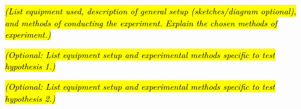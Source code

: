 \documentclass{Laboratory-Report}
\begin{document}
\MakeCover
\MakeDeclarationPage

\Title{}

\begin{PurposeofExperiment}
\end{PurposeofExperiment}

\begin{Inferences}
  \item
  \item
  \item
\end{Inferences}

\begin{Hypotheses}
  \item
  \item
  \item
\end{Hypotheses}

\begin{ExperimentalVariables}
\end{ExperimentalVariables}

\ReportMethods

{\fontsize{10}{13.2}\selectfont\itshape\RaggedRight
\hl{(List equipment used, description of general setup (sketches/diagram optional), and methods of conducting the experiment. Explain the chosen methods of experiment.)}\par} %

{\fontsize{10}{13.2}\selectfont\itshape\RaggedRight
\hl{(Optional: List equipment setup and experimental methods specific to test hypothesis 1.)}\par} %

{\fontsize{10}{13.2}\selectfont\itshape\RaggedRight
\hl{(Optional: List equipment setup and experimental methods specific to test hypothesis 2.)}\par} %

\ReportResults
\end{document}
